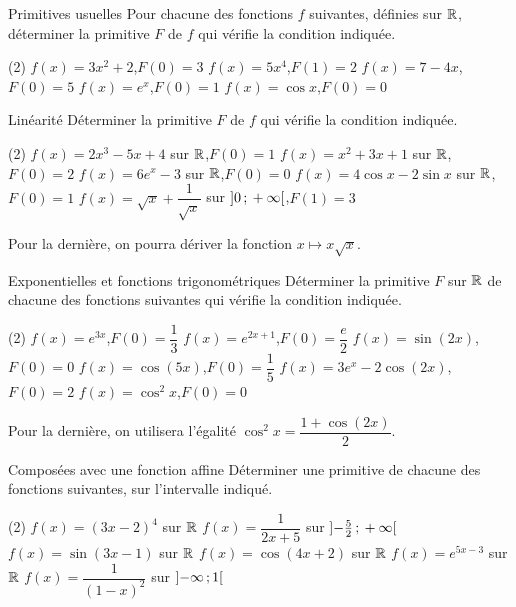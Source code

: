 \exercices
{}

\begin{exercice}[1]{Primitives usuelles}
Pour chacune des fonctions $f$ suivantes, définies sur $\mathbb{R}$, déterminer la primitive $F$ de $f$ qui vérifie la condition indiquée.
\begin{tasks}(2)
  \task $f(x)=3x^{2}+2$,\enspace $F(0)=3$
  \task $f(x)=5x^{4}$,\enspace $F(1)=2$
  \task $f(x)=7-4x$,\enspace $F(0)=5$
  \task $f(x)=e^{x}$,\enspace $F(0)=1$
  \task $f(x)=\cos x$,\enspace $F(0)=0$
\end{tasks}
\end{exercice}

\begin{exercice}[1]{Linéarité}
Déterminer la primitive $F$ de $f$ qui vérifie la condition indiquée.
\begin{tasks}(2)
  \task $f(x)=2x^{3}-5x+4$ sur $\mathbb{R}$,\enspace $F(0)=1$
  \task $f(x)=x^{2}+3x+1$ sur $\mathbb{R}$,\enspace $F(0)=2$
  \task $f(x)=6e^{x}-3$ sur $\mathbb{R}$,\enspace $F(0)=0$
  \task $f(x)=4\cos x-2\sin x$ sur $\mathbb{R}$,\enspace $F(0)=1$
  \task $f(x)=\sqrt x+\dfrac{1}{\sqrt x}$ sur $\mathopen{]}0\,{;}\,+\infty\mathclose{[}$,\enspace $F(1)=3$
\end{tasks}
Pour la dernière, on pourra dériver la fonction $x\mapsto x\sqrt x$.
\end{exercice}


\begin{exercice}[2]{Exponentielles et fonctions trigonométriques}
Déterminer la primitive $F$ sur $\mathbb{R}$ de chacune des fonctions suivantes qui vérifie la condition indiquée.
\begin{tasks}(2)
  \task $f(x)=e^{3x}$,\enspace $F(0)=\dfrac13$
  \task $f(x)=e^{2x+1}$,\enspace $F(0)=\dfrac e2$
  \task $f(x)=\sin(2x)$,\enspace $F(0)=0$
  \task $f(x)=\cos(5x)$,\enspace $F(0)=\dfrac15$
  \task $f(x)=3e^{x}-2\cos(2x)$,\enspace $F(0)=2$
  \task $f(x)=\cos^{2}x$,\enspace $F(0)=0$
\end{tasks}
Pour la dernière, on utilisera l'égalité $\cos^{2}x=\dfrac{1+\cos(2x)}{2}$.
\end{exercice}

\begin{exercice}[2]{Composées avec une fonction affine}
Déterminer une primitive de chacune des fonctions suivantes, sur l'intervalle indiqué.
\begin{tasks}(2)
  \task $f(x)=(3x-2)^{4}$ sur $\mathbb{R}$
  \task $f(x)=\dfrac{1}{2x+5}$ sur $\mathopen{]}-\frac52\,{;}\,+\infty\mathclose{[}$
  \task $f(x)=\sin(3x-1)$ sur $\mathbb{R}$
  \task $f(x)=\cos(4x+2)$ sur $\mathbb{R}$
  \task $f(x)=e^{5x-3}$ sur $\mathbb{R}$
  \task $f(x)=\dfrac{1}{(1-x)^{2}}$ sur $\mathopen{]}-\infty\,{;}\,1\mathclose{[}$
\end{tasks}
\end{exercice}

